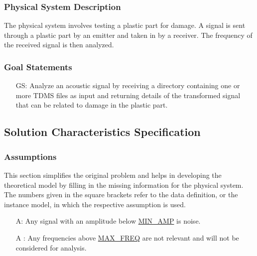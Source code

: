 \documentclass[12pt]{article}
\newcounter{assumpnum} %
\newcounter{goalnum} %
\begin{document}
\subsubsection{Physical System Description}

The physical system involves testing a plastic part for damage. A signal is sent 
through a plastic part by an emitter and taken in by a receiver. The frequency 
of the received signal is then analyzed.

\subsubsection{Goal Statements}

\begin{itemize}
\item[GS\refstepcounter{goalnum}\thegoalnum:] Analyze an acoustic signal by 
receiving a directory containing one or more TDMS files as input and returning
details of the transformed signal that can be related to damage in the
 plastic part.
\end{itemize}

\subsection{Solution Characteristics Specification}

\subsubsection{Assumptions} \label{Assumptions}

This section simplifies the original problem and helps in developing the
theoretical model by filling in the missing information for the physical
system. The numbers given in the square brackets refer to the data definition,
or the instance model, in which the respective assumption is used.

\begin{itemize}

\item[A\refstepcounter{assumpnum}\theassumpnum \label{A_MinVolt}:] Any signal
  with an amplitude below \hyperref[AppendA]{MIN\_AMP} is noise. 
\item[A\refstepcounter{assumpnum}\theassumpnum
\label{A_MaxFreq}:]Any frequencies above \hyperref[AppendA]{MAX\_FREQ} are not
relevant and will not be considered for analysis.

\end{itemize}
\end{document}

